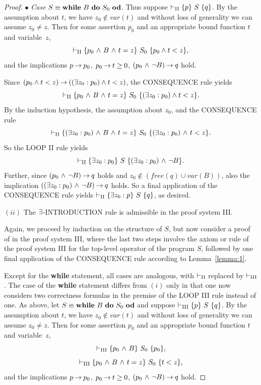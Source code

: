 \documentclass[manuscript, screen, review]{acmart}
\begin{document}
\begin{proof}
\III

\NI
$\bullet$ \emph{Case} $S \equiv \mbox{$\mbox{{\bf while}\ } {B}\ \mbox{{\bf do}\ } {S_0}\ \mbox{{\bf od}}$}$.
Thus suppose $\vdash_{\rm{II}} \mbox{$\{{p}\}\ {S}\ \{{q}\}$}$.
By the assumption about $t$, we have
$z_0 \not \in var(t)$ and without loss of generality we can assume $z_0 \neq z$.
Then for some assertion $p_{0}$ and an appropriate bound function $t$ and
variable~$z$,
\[
 \vdash_{\rm{II}} \mbox{$\{{p_{0} \mbox{$\ \wedge\ $} B \mbox{$\ \wedge\ $} t = z}\}\ {S_0}\ \{{p_0\wedge t < z}\}$},
\]
and the implications
$p \mbox{$\:\rightarrow\:$} p_{0}$, $p_{0} \mbox{$\:\rightarrow\:$} t \ge 0$,  $(p_{0} \mbox{$\ \wedge\ $} \neg B) \mbox{$\:\rightarrow\:$} q$
hold.

Since $(p_0\wedge t<z) \mbox{$\:\rightarrow\:$} ((\mbox{$\exists$} z_0: p_0)\wedge t<z) $, the CONSEQUENCE rule yields
\[
 \vdash_{\rm{II}} \mbox{$\{{p_{0} \mbox{$\ \wedge\ $} B \mbox{$\ \wedge\ $} t=z}\}\ {S_0}\ \{{(\mbox{$\exists$} z_0: p_{0})\wedge t<z }\}$}.
\]
By the induction hypothesis, the assumption about $z_0$,
and the CONSEQUENCE rule 
\[
 \vdash_{\rm{II}} \mbox{$\{{(\mbox{$\exists$} z_0:p_0) \mbox{$\ \wedge\ $} B \mbox{$\ \wedge\ $} t = z}\}\ {S_0}\ \{{(\mbox{$\exists$} z_0:p_0)\mbox{$\ \wedge\ $} t < z}\}$}.
\]
So the LOOP II rule yields 
\[
 \vdash_{\rm{II}} \mbox{$\{{\mbox{$\exists$} z_0:p_0}\}\ {S}\ \{{(\mbox{$\exists$} z_0:p_0) \mbox{$\ \wedge\ $} \neg B}\}$}.
\]
Further, since $(p_{0} \mbox{$\ \wedge\ $} \neg B) \mbox{$\:\rightarrow\:$} q$ holds and
$z_0 \not\in (\mathit{free(q)} \cup var(B))$, also the implication
$((\mbox{$\exists$} z_0:p_0) \mbox{$\ \wedge\ $} \neg B) \mbox{$\:\rightarrow\:$} q$ holds.  So a final application of the
CONSEQUENCE rule yields $\vdash_{\rm{II}} \mbox{$\{{\mbox{$\exists$} z_0:p}\}\ {S}\ \{{q}\}$}$, as
desired.

\III

\NI
$(ii)$ The $\mbox{$\exists$}$-{\rm INTRODUCTION} rule is admissible in the proof system {\rm III}.

Again, we proceed by induction on the structure of $S$,
but now consider a proof of  in the proof system \rm{III}, where 
the last two steps involve the axiom or rule of the proof system \rm{III} 
for the top-level operator of the program $S$, 
followed by one final application of the CONSEQUENCE rule
according to Lemma~\ref{lemma:1}.

Except for the \textbf{while} statement, all cases are analogous, 
with $\vdash_{\rm{II}}$ replaced by $\vdash_{\rm{III}}$. 
The case of the \textbf{while} statement differs from $(i)$ only 
in that one now considers two correctness formulas in the premise 
of the LOOP III rule instead of one. 
As above, let $S \equiv \mbox{$\mbox{{\bf while}\ } {B}\ \mbox{{\bf do}\ } {S_0}\ \mbox{{\bf od}}$}$ and
suppose $\vdash_{\rm{III}} \mbox{$\{{p}\}\ {S}\ \{{q}\}$}$.
By the assumption about $t$, we have
$z_0 \not \in var(t)$ and without loss of generality we can assume $z_0 \neq z$.
Then for some assertion $p_{0}$ and an appropriate bound function $t$ and
variable~$z$,
\[
 \vdash_{\rm{III}} \mbox{$\{{p_{0} \mbox{$\ \wedge\ $} B}\}\ {S_0}\ \{{p_{0}}\}$},
\]
\[
 \vdash_{\rm{III}} \mbox{$\{{p_{0} \mbox{$\ \wedge\ $} B \mbox{$\ \wedge\ $} t = z}\}\ {S_0}\ \{{t < z}\}$},
\]
and the implications
$p \mbox{$\:\rightarrow\:$} p_{0}$, $p_{0} \mbox{$\:\rightarrow\:$} t \ge 0$,  $(p_{0} \mbox{$\ \wedge\ $} \neg B) \mbox{$\:\rightarrow\:$} q$
hold.


\end{proof}
\end{document}
